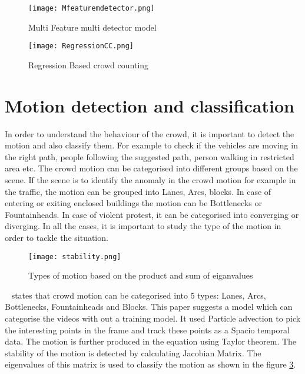 \begin{figure}[tb]
	\center\texttt{[image: Mfeaturemdetector.png]}
	\caption{Multi Feature multi detector model}
	\label{fig:rmfmdcc}
\end{figure}

\begin{figure}[tb]
	\center\texttt{[image: RegressionCC.png]}
	\caption{Regression Based crowd counting}
	\label{fig:regcc}
\end{figure}

\section{Motion detection and classification}
In order to understand the behaviour of the crowd, it is important to detect the motion and also classify them. For example to check if the vehicles are moving in the right path, people following the suggested path, person walking in restricted area etc. The crowd motion can be categorised into different groups based on the scene. If the scene is to identify the anomaly in the crowd motion for example in the traffic, the motion can be grouped into Lanes, Arcs, blocks. In case of entering or exiting enclosed buildings the motion can be Bottlenecks or Fountainheads. In case of violent protest, it can be categorised into converging or diverging. In all the cases, it is important to study the type of the motion in order to tackle the situation.

\begin{figure}[tb]
	\center\texttt{[image: stability.png]}
	\caption{Types of motion based on the product and sum of eiganvalues}
	\label{fig:stability}
\end{figure}

~\cite{solmaz2012identifying} states that crowd motion can be categorised into 5 types: Lanes, Arcs, Bottlenecks, Fountainheads and Blocks. This paper suggests a model which can categorise the videos with out a training model. It used Particle advection to pick the interesting points in the frame and track these points as a Spacio temporal data. The motion is further produced in the equation using Taylor theorem. The stability of the motion is detected by calculating Jacobian Matrix. The eigenvalues of this matrix is used to classify the motion as shown in the figure \ref{fig:stability}.



 

 